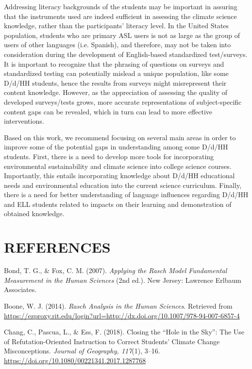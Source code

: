 \documentclass[11.5pt]{sig-alternate} %
\begin{document}
\begin{large}
Addressing literacy backgrounds of the students may be important in assuring that the instruments used are indeed sufficient in assessing the climate science knowledge, rather than the participants’ literacy level. In the United States population, students who are primary ASL users is not as large as the group of users of other languages (i.e. Spanish), and therefore, may not be taken into consideration during the development of English-based standardized test/surveys. It is important to recognize that the phrasing of questions on surveys and standardized testing can potentially mislead a unique population, like some D/d/HH students, hence the results from surveys might misrepresent their content knowledge.  However, as the appreciation of assessing the quality of developed surveys/tests grows, more accurate representations of subject-specific content gaps can be revealed, which in turn can lead to more effective interventions. 

Based on this work, we recommend focusing on several main areas in order to improve some of the potential gaps in understanding among some D/d/HH students. First, there is a need to develop more tools for incorporating environmental sustainability and climate science into college science courses.  Importantly, this entails incorporating knowledge about D/d/HH educational needs and environmental education into the current science curriculum. Finally, there is a need for better understanding of language influences regarding D/d/HH and ELL students related to impacts on their learning and demonstration of obtained knowledge.  

\end{large}
\clearpage
\section*{REFERENCES}\par 

\leftskip 0.25in
\parindent -0.25in 
Bond, T. G., \& Fox, C. M. (2007). \textit{Applying the Rasch Model Fundamental Measurement in the Human Sciences} (2nd ed.). New Jersey: Lawrence Erlbaum Associates.

Boone, W. J. (2014). \textit{Rasch Analysis in the Human Sciences}. Retrieved from \url{https://ezproxy.rit.edu/login?url=http://dx.doi.org/10.1007/978-94-007-6857-4}

Chang, C., Pascua, L., \& Ess, F. (2018). Closing the “Hole in the Sky”: The Use of Refutation-Oriented Instruction to Correct Students’ Climate Change Misconceptions. \textit{Journal of Geography, 117}(1), 3–16. \url{https://doi.org/10.1080/00221341.2017.1287768}
\end{document}
